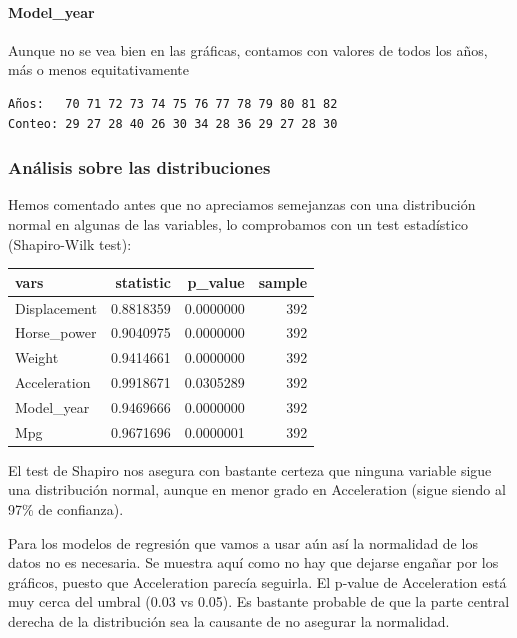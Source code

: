 \paragraph{Model\_year}
Aunque no se vea bien en las gráficas, contamos con valores de todos los años, más o menos equitativamente

\begin{verbatim}
Años:   70 71 72 73 74 75 76 77 78 79 80 81 82 
Conteo: 29 27 28 40 26 30 34 28 36 29 27 28 30 
\end{verbatim}


\subsubsection{Análisis sobre las distribuciones}

Hemos comentado antes que no apreciamos semejanzas con una distribución normal en algunas de las variables, lo comprobamos con un test estadístico (Shapiro-Wilk test):
\vspace{\baselineskip}
\begin{tabular}{l|r|r|r}
\hline
vars & statistic & p\_value & sample\\
\hline
Displacement & 0.8818359 & 0.0000000 & 392\\
\hline
Horse\_power & 0.9040975 & 0.0000000 & 392\\
\hline
Weight & 0.9414661 & 0.0000000 & 392\\
\hline
Acceleration & 0.9918671 & 0.0305289 & 392\\
\hline
Model\_year & 0.9469666 & 0.0000000 & 392\\
\hline
Mpg & 0.9671696 & 0.0000001 & 392\\
\hline
\end{tabular}

\vspace{\baselineskip}

El test de Shapiro nos asegura con bastante certeza que ninguna variable sigue una distribución normal, aunque en menor grado en Acceleration (sigue siendo al 97\% de confianza).

Para los modelos de regresión que vamos a usar aún así la normalidad de los datos no es necesaria.
\vspace{\baselineskip}
Se muestra aquí como no hay que dejarse engañar por los gráficos, puesto que Acceleration parecía seguirla. El p-value de Acceleration está muy cerca del umbral (0.03 vs 0.05). Es bastante probable de que la parte central derecha de la distribución sea la causante de no asegurar la normalidad.


